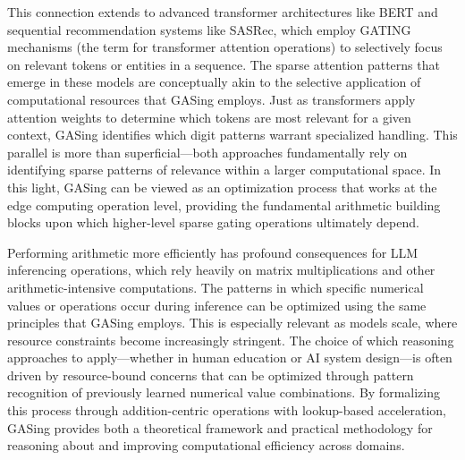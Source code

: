 This connection extends to advanced transformer architectures like BERT and sequential recommendation systems like SASRec, which employ GATING mechanisms (the term for transformer attention operations) to selectively focus on relevant tokens or entities in a sequence. The sparse attention patterns that emerge in these models are conceptually akin to the selective application of computational resources that GASing employs. Just as transformers apply attention weights to determine which tokens are most relevant for a given context, GASing identifies which digit patterns warrant specialized handling. This parallel is more than superficial—both approaches fundamentally rely on identifying sparse patterns of relevance within a larger computational space. In this light, GASing can be viewed as an optimization process that works at the edge computing operation level, providing the fundamental arithmetic building blocks upon which higher-level sparse gating operations ultimately depend.

Performing arithmetic more efficiently has profound consequences for LLM inferencing operations, which rely heavily on matrix multiplications and other arithmetic-intensive computations. The patterns in which specific numerical values or operations occur during inference can be optimized using the same principles that GASing employs. This is especially relevant as models scale, where resource constraints become increasingly stringent. The choice of which reasoning approaches to apply—whether in human education or AI system design—is often driven by resource-bound concerns that can be optimized through pattern recognition of previously learned numerical value combinations. By formalizing this process through addition-centric operations with lookup-based acceleration, GASing provides both a theoretical framework and practical methodology for reasoning about and improving computational efficiency across domains.
